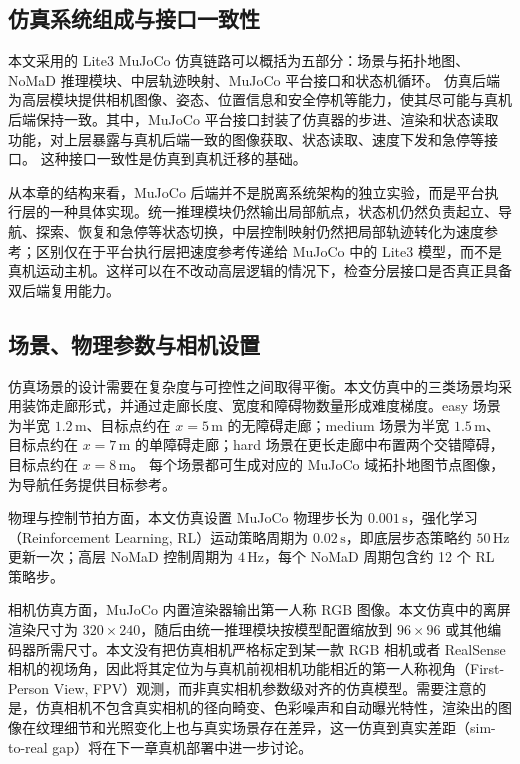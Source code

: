 \subsection{仿真系统组成与接口一致性}

本文采用的 Lite3 MuJoCo 仿真链路可以概括为五部分：场景与拓扑地图、NoMaD 推理模块、中层轨迹映射、MuJoCo 平台接口和状态机循环。
仿真后端为高层模块提供相机图像、姿态、位置信息和安全停机等能力，使其尽可能与真机后端保持一致。其中，MuJoCo 平台接口封装了仿真器的步进、渲染和状态读取功能，对上层暴露与真机后端一致的图像获取、状态读取、速度下发和急停等接口。
这种接口一致性是仿真到真机迁移的基础。

从本章的结构来看，MuJoCo 后端并不是脱离系统架构的独立实验，而是平台执行层的一种具体实现。统一推理模块仍然输出局部航点，状态机仍然负责起立、导航、探索、恢复和急停等状态切换，中层控制映射仍然把局部轨迹转化为速度参考；区别仅在于平台执行层把速度参考传递给 MuJoCo 中的 Lite3 模型，而不是真机运动主机。这样可以在不改动高层逻辑的情况下，检查分层接口是否真正具备双后端复用能力。

\subsection{场景、物理参数与相机设置}

仿真场景的设计需要在复杂度与可控性之间取得平衡。本文仿真中的三类场景均采用装饰走廊形式，并通过走廊长度、宽度和障碍物数量形成难度梯度。easy 场景为半宽 $1.2\,\mathrm{m}$、目标点约在 $x=5\,\mathrm{m}$ 的无障碍走廊；medium 场景为半宽 $1.5\,\mathrm{m}$、目标点约在 $x=7\,\mathrm{m}$ 的单障碍走廊；hard 场景在更长走廊中布置两个交错障碍，目标点约在 $x=8\,\mathrm{m}$。
每个场景都可生成对应的 MuJoCo 域拓扑地图节点图像，为导航任务提供目标参考。

物理与控制节拍方面，本文仿真设置 MuJoCo 物理步长为 $0.001\,\mathrm{s}$，强化学习（Reinforcement Learning, RL）运动策略周期为 $0.02\,\mathrm{s}$，即底层步态策略约 $50\,\mathrm{Hz}$ 更新一次；高层 NoMaD 控制周期为 $4\,\mathrm{Hz}$，每个 NoMaD 周期包含约 12 个 RL 策略步。

相机仿真方面，MuJoCo 内置渲染器输出第一人称 RGB 图像。本文仿真中的离屏渲染尺寸为 $320 \times 240$，随后由统一推理模块按模型配置缩放到 $96\times96$ 或其他编码器所需尺寸。本文没有把仿真相机严格标定到某一款 RGB 相机或者 RealSense 相机的视场角，因此将其定位为与真机前视相机功能相近的第一人称视角（First-Person View, FPV）观测，而非真实相机参数级对齐的仿真模型。需要注意的是，仿真相机不包含真实相机的径向畸变、色彩噪声和自动曝光特性，渲染出的图像在纹理细节和光照变化上也与真实场景存在差异，这一仿真到真实差距（sim-to-real gap）将在下一章真机部署中进一步讨论。

